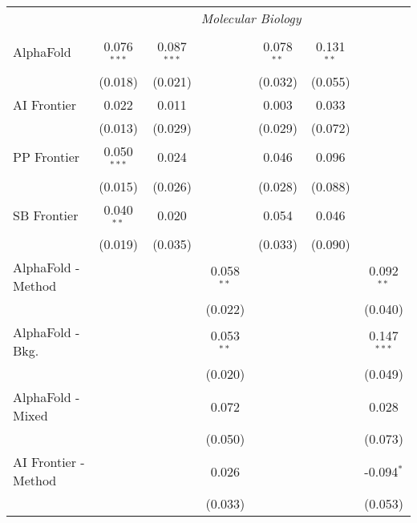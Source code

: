 \begin{tabular}{lcccccc}
 & \multicolumn{6}{c}{\textit{Molecular Biology}} \\ \\
   AlphaFold            & 0.076$^{***}$ & 0.087$^{***}$ &              & 0.078$^{**}$ & 0.131$^{**}$ &   \\   
                        & (0.018)       & (0.021)       &              & (0.032)      & (0.055)      &   \\   
   AI Frontier          & 0.022         & 0.011         &              & 0.003        & 0.033        &   \\   
                        & (0.013)       & (0.029)       &              & (0.029)      & (0.072)      &   \\   
   PP Frontier          & 0.050$^{***}$ & 0.024         &              & 0.046        & 0.096        &   \\   
                        & (0.015)       & (0.026)       &              & (0.028)      & (0.088)      &   \\   
   SB Frontier          & 0.040$^{**}$  & 0.020         &              & 0.054        & 0.046        &   \\   
                        & (0.019)       & (0.035)       &              & (0.033)      & (0.090)      &   \\   
   AlphaFold - Method   &               &               & 0.058$^{**}$ &              &              & 0.092$^{**}$\\   
                        &               &               & (0.022)      &              &              & (0.040)\\   
   AlphaFold - Bkg.     &               &               & 0.053$^{**}$ &              &              & 0.147$^{***}$\\   
                        &               &               & (0.020)      &              &              & (0.049)\\   
   AlphaFold - Mixed    &               &               & 0.072        &              &              & 0.028\\   
                        &               &               & (0.050)      &              &              & (0.073)\\   
   AI Frontier - Method &               &               & 0.026        &              &              & -0.094$^{*}$\\   
                        &               &               & (0.033)      &              &              & (0.053)\\   

\end{tabular}
